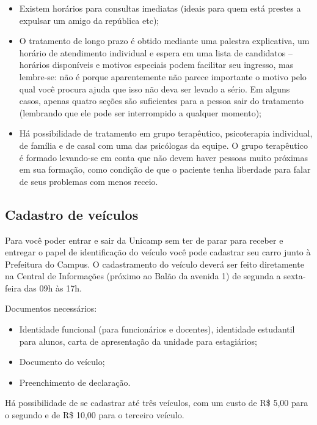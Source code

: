 \begin{itemize}
    \item  Existem horários para consultas imediatas (ideais para quem está
        prestes a expulsar um amigo da república etc);

    \item  O tratamento de longo prazo é obtido mediante uma palestra
        explicativa, um horário de atendimento individual e espera em uma lista
        de candidatos -- horários disponíveis e motivos especiais podem
        facilitar seu ingresso, mas lembre-se: não é porque aparentemente não
        parece importante o motivo pelo qual você procura ajuda que isso não
        deva ser levado a sério. Em alguns casos, apenas quatro seções são
        suficientes para a pessoa sair do tratamento (lembrando que ele pode ser
        interrompido a qualquer momento);

    \item  Há possibilidade de tratamento em grupo terapêutico, psicoterapia
        individual, de família e de casal com uma das psicólogas da equipe. O
        grupo terapêutico é formado levando-se em conta que não devem haver
        pessoas muito próximas em sua formação, como condição de que o paciente
        tenha liberdade para falar de seus problemas com menos receio.
\end{itemize}

\subsection{Cadastro de veículos}

Para você poder entrar e sair da Unicamp sem ter de parar para receber e
entregar o papel de identificação do veículo você pode cadastrar seu carro junto
à Prefeitura do Campus. O cadastramento do veículo deverá ser feito diretamente
na Central de Informações (próximo ao Balão da avenida 1) de segunda a
sexta-feira das 09h às 17h.

Documentos necessários:

\begin{itemize}
    \item  Identidade funcional (para funcionários e docentes), identidade
        estudantil para alunos, carta de apresentação da unidade para
        estagiários;
    \item  Documento do veículo;
    \item  Preenchimento de declaração.
\end{itemize}
Há possibilidade de se cadastrar até três veículos, com um custo de R\$ 5,00
para o segundo e de R\$ 10,00 para o terceiro veículo.

